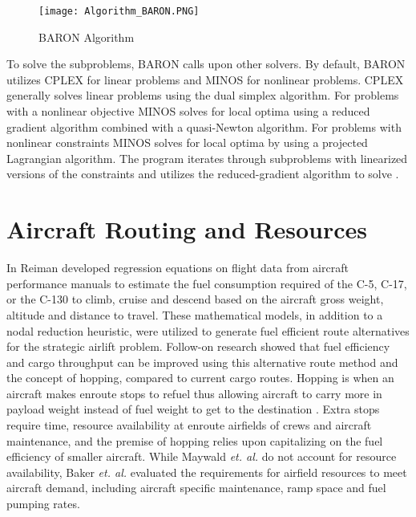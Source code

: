 \begin{figure}[H]
\centering
\texttt{[image: Algorithm\_BARON.PNG]}
\caption{BARON Algorithm \cite{Lipp2011BARONCME334}}
\label{fig_BARON}
\end{figure}

To solve the subproblems, BARON calls upon other solvers. By default, BARON utilizes CPLEX for linear problems and MINOS for nonlinear problems. CPLEX generally solves linear problems using the dual simplex algorithm. For problems with a nonlinear objective MINOS solves for local optima using a reduced gradient algorithm combined with a quasi-Newton algorithm. For problems with nonlinear constraints MINOS solves for local optima by using a projected Lagrangian algorithm. The program iterates through subproblems with linearized versions of the constraints and utilizes the reduced-gradient algorithm to solve \cite{GAMS_old}. 
\section{Aircraft Routing and Resources}
In \cite{Reiman2014} Reiman developed regression equations on flight data from aircraft performance manuals to estimate the fuel consumption required of the C-5, C-17, or the C-130 to climb, cruise and descend based on the aircraft gross weight, altitude and distance to travel. 
These mathematical models, in addition to a nodal reduction heuristic, were utilized to generate fuel efficient route alternatives for the strategic airlift problem. Follow-on research \cite{maywald} showed that fuel efficiency and cargo throughput can be improved using this alternative route method and the concept of hopping, compared to current cargo routes. Hopping is when an aircraft makes enroute stops to refuel thus allowing aircraft to carry more in payload weight instead of fuel weight to get to the destination \cite{Nangia2006OperationsRefuelling}. Extra stops require time, resource availability at enroute airfields of crews and aircraft maintenance, and the premise of hopping relies upon capitalizing on the fuel efficiency of smaller aircraft. While Maywald \textit{et. al.} \cite{maywald} do not account for resource availability, Baker \textit{et. al.} \cite{Baker2002OptimizingAirlift} evaluated the requirements for airfield resources to meet aircraft demand, including aircraft specific maintenance, ramp space and fuel pumping rates. 